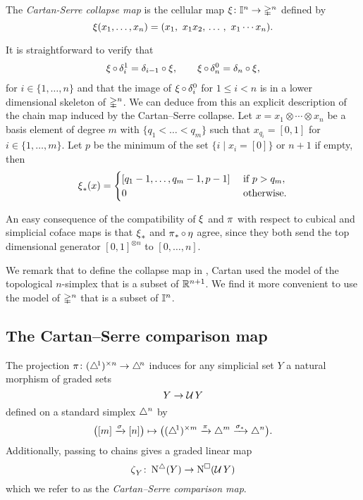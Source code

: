 \begin{definition}
	The \textit{Cartan-Serre collapse map} is the cellular map $\operatorname{\xi} \colon \mathbb{I}^n \to \mathbb{\Delta}^n$ defined by
	\[
	\operatorname{\xi}(x_1, \dots, x_n) = (x_1,\ x_1 x_2, \, \dots \, , \ x_1 \dotsm x_n).
	\]
\end{definition}

It is straightforward to verify that
\begin{align*}
\operatorname{\xi} \circ \, \delta_i^1 = \delta_{i-1} \circ \operatorname{\xi}, \qquad
\operatorname{\xi} \circ \, \delta_n^0 = \delta_n \circ \operatorname{\xi},
\end{align*}
for $i \in \{1, \dots, n\}$ and that the image of $\operatorname{\xi} \circ \, \delta_i^0$ for $1 \leq i < n$ is in a lower dimensional skeleton of $\mathbb{\Delta}^n$.
We can deduce from this an explicit description of the chain map induced by the Cartan--Serre collapse.
Let $x = x_1 \otimes \cdots \otimes x_n$ be a basis element of degree $m$ with $\{q_1 < \dots < q_m\}$ such that $x_{q_i} = [0,1]$ for $i \in \{1, \dots, m\}$.
Let $p$ be the minimum of the set $\{i \mid x_i = [0]\}$ or $n+1$ if empty, then
\begin{equation} \label{e:explicit description of chain cs collapse}
	\operatorname{\xi}_\ast(x) = \begin{cases}
	[q_1-1, \dots, q_m-1, p-1] & \text{ if } p > q_m, \\
	0 & \text{ otherwise}.
	\end{cases}
\end{equation}

An easy consequence of the compatibility of $\operatorname{\xi}$ and $\operatorname{\pi}$ with respect to cubical and simplicial coface maps is that $\operatorname{\xi}_\ast$ and $\operatorname{\pi}_\ast \circ \operatorname{\eta}$ agree, since they both send the top dimensional generator $[0,1]^{\otimes n}$ to $[0, \dots, n]$.

We remark that to define the collapse map in \cite[p. 442]{serre1951homologie}, Cartan used the model of the topological $n$-simplex that is a subset of $\mathbb{R}^{n+1}$.
We find it more convenient to use the model of $\mathbb{\Delta}^n$ that is a subset of $\mathbb{I}^n$.

\subsection{The Cartan--Serre comparison map} \label{ss:comparison map}

The projection $\operatorname{\pi} \colon (\triangle^{\!1})^{\times n} \to \triangle^{\!n}$ induces for any simplicial set $Y$ a natural morphism of graded sets
\[
Y \to \operatorname{\mathcal{U}} Y
\]
defined on a standard simplex $\triangle^n$ by
\[
\big( [m] \xrightarrow{\sigma} [n] \big) \mapsto
\big( (\triangle^{\!1})^{\times m} \xrightarrow{\operatorname{\pi}} \triangle^m \xrightarrow{\sigma_\ast} \triangle^n \big).
\]
Additionally, passing to chains gives a graded linear map
\[
\operatorname{\zeta}_Y \colon \operatorname{N^{\triangle}}(Y) \to \operatorname{N^{\square}}(\operatorname{\mathcal{U}} Y)
\]
which we refer to as the \textit{Cartan--Serre comparison map}.

